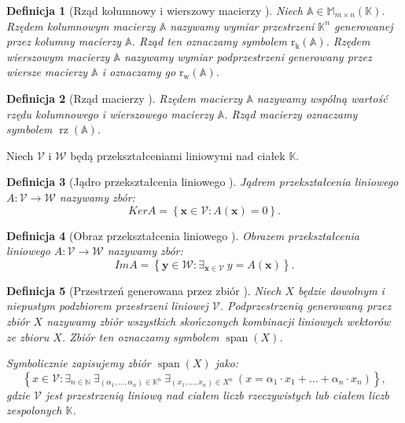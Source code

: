 \documentclass[12pt,a4paper]{report}
\newtheorem{df}{Definicja}[chapter]
\newcommand{\set}[1]{\left\lbrace {#1} \right\rbrace}
\newcommand{\setK}{\mathbb{K}}
\newcommand{\setN}{\mathbb{N}}
\newcommand{\przestrzen}[1]{\operatorname{span}\left({#1} \right)}
\newcommand{\rw}[1]{\operatorname{r_w}\left({#1} \right)}
\newcommand{\rk}[1]{\operatorname{r_k}\left({#1} \right)}
\newcommand{\rz}[1]{\operatorname{rz}\left({#1} \right)}
\begin{document}
\begin{df}[Rząd kolumnowy i wierszowy macierzy {\citep[Sec 8.1]{alzega}}]
Niech $\mathbb{A} \in \mathbb{M}_{m\times n}(\setK)$. Rzędem kolumnowym macierzy $\mathbb{A}$ nazywamy wymiar przestrzeni $\setK^n$ generowanej przez kolumny macierzy $\mathbb{A}$. Rząd ten oznaczamy symbolem $\rk{\mathbb{A}}$. Rzędem wierszowym macierzy $\mathbb{A}$ nazywamy wymiar podprzestrzeni generowany przez wiersze macierzy $\mathbb{A}$ i oznaczamy go $\rw{\mathbb{A}}$.
\end{df}

\begin{df}[Rząd macierzy {\citep[Sec 8.1]{alzega}}]
Rzędem macierzy $\mathbb{A}$ nazywamy wspólną wartość rzędu kolumnowego i wierszowego macierzy $\mathbb{A}$. Rząd macierzy oznaczamy symbolem $\rz{\mathbb{A}}$.
\end{df}

Niech $\mathcal{V}$ i $\mathcal{W}$ będą przekształceniami liniowymi nad ciałek $\setK$.
\begin{df}[Jądro przekształcenia liniowego {\citep[Sec 8.1]{alzega}}]
Jądrem przekształcenia liniowego $A: \mathcal{V}\to \mathcal{W}$ nazywamy zbór:
$$
Ker A = \set{ \mathbf{x} \in \mathcal{V} : A(\mathbf{x}) = 0}.
$$
\end{df}

\begin{df}[Obraz przekształcenia liniowego {\citep[Sec 8.1]{alzega}}]
Obrazem przekształcenia liniowego $A: \mathcal{V}\to \mathcal{W}$ nazywamy zbór:
$$
Im A = \set{ \mathbf{y} \in \mathcal{W} : \exists_{\mathbf{x} \in \mathcal{V}} \: y = A(\mathbf{x})}.
$$
\end{df}

\begin{df}[Przestrzeń generowana przez zbiór {\citep[Sec 7.1 Def 7.13]{alzega}}]
Niech $\mathit{X}$ będzie dowolnym i niepustym podzbiorem przestrzeni liniowej $\mathcal{V}$. Podprzestrzenią generowaną przez zbiór $\mathit{X}$ nazywamy zbiór wszystkich  skończonych kombinacji liniowych wektorów ze zbioru $\mathit{X}$. Zbiór ten oznaczamy symbolem $\przestrzen{\mathit{X}}$.

Symbolicznie zapisujemy zbiór $\przestrzen{\mathit{X}}$ jako:
$$
\set{x \in \mathcal{V} : \exists_{n \in \setN} \: \exists_{(\alpha_1, \ldots, \alpha_n) \in \setK^n } \: \exists_{(x_1, \ldots, x_n) \in \mathit{X}^n} \: (x = \alpha_1 \cdot x_1 + \ldots + \alpha_n \cdot x_n)},
$$
gdzie $\mathcal{V}$ jest przestrzenią liniową nad ciałem liczb rzeczywistych lub ciałem liczb zespolonych $\setK$.
\end{df}
\end{document}
